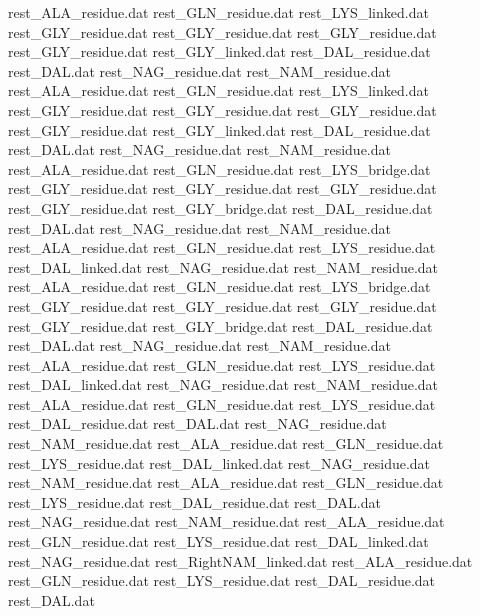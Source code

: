 rest_ALA_residue.dat            
rest_GLN_residue.dat            
rest_LYS_linked.dat             
rest_GLY_residue.dat
rest_GLY_residue.dat
rest_GLY_residue.dat
rest_GLY_residue.dat
rest_GLY_linked.dat
rest_DAL_residue.dat            
rest_DAL.dat                    
rest_NAG_residue.dat            
rest_NAM_residue.dat            
rest_ALA_residue.dat            
rest_GLN_residue.dat            
rest_LYS_linked.dat             
rest_GLY_residue.dat
rest_GLY_residue.dat
rest_GLY_residue.dat
rest_GLY_residue.dat
rest_GLY_linked.dat
rest_DAL_residue.dat            
rest_DAL.dat                    
rest_NAG_residue.dat            
rest_NAM_residue.dat            
rest_ALA_residue.dat            
rest_GLN_residue.dat            
rest_LYS_bridge.dat             
rest_GLY_residue.dat
rest_GLY_residue.dat
rest_GLY_residue.dat
rest_GLY_residue.dat
rest_GLY_bridge.dat
rest_DAL_residue.dat            
rest_DAL.dat                    
rest_NAG_residue.dat            
rest_NAM_residue.dat            
rest_ALA_residue.dat            
rest_GLN_residue.dat            
rest_LYS_residue.dat            
rest_DAL_linked.dat             
rest_NAG_residue.dat            
rest_NAM_residue.dat            
rest_ALA_residue.dat            
rest_GLN_residue.dat            
rest_LYS_bridge.dat             
rest_GLY_residue.dat
rest_GLY_residue.dat
rest_GLY_residue.dat
rest_GLY_residue.dat
rest_GLY_bridge.dat
rest_DAL_residue.dat            
rest_DAL.dat                    
rest_NAG_residue.dat            
rest_NAM_residue.dat            
rest_ALA_residue.dat            
rest_GLN_residue.dat            
rest_LYS_residue.dat            
rest_DAL_linked.dat             
rest_NAG_residue.dat            
rest_NAM_residue.dat            
rest_ALA_residue.dat            
rest_GLN_residue.dat            
rest_LYS_residue.dat            
rest_DAL_residue.dat            
rest_DAL.dat                    
rest_NAG_residue.dat            
rest_NAM_residue.dat            
rest_ALA_residue.dat            
rest_GLN_residue.dat            
rest_LYS_residue.dat            
rest_DAL_linked.dat             
rest_NAG_residue.dat            
rest_NAM_residue.dat            
rest_ALA_residue.dat            
rest_GLN_residue.dat            
rest_LYS_residue.dat            
rest_DAL_residue.dat            
rest_DAL.dat                    
rest_NAG_residue.dat            
rest_NAM_residue.dat            
rest_ALA_residue.dat            
rest_GLN_residue.dat            
rest_LYS_residue.dat            
rest_DAL_linked.dat             
rest_NAG_residue.dat            
rest_RightNAM_linked.dat        
rest_ALA_residue.dat            
rest_GLN_residue.dat            
rest_LYS_residue.dat            
rest_DAL_residue.dat            
rest_DAL.dat                    
